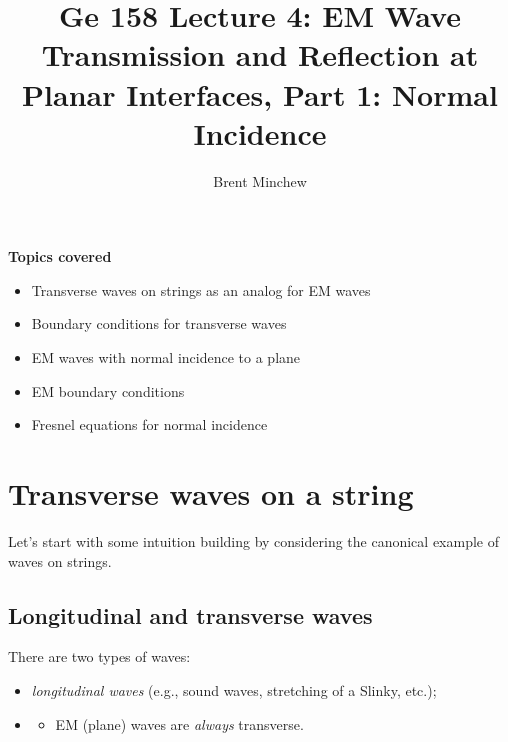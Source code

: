 \documentclass[11pt, oneside]{article}
\title{Ge 158 Lecture 4: EM Wave Transmission and Reflection at Planar Interfaces, Part 1: Normal Incidence}
\author{Brent Minchew}
\date{}
\begin{document}
\maketitle

\noindent\textbf{Topics covered}
\begin{itemize}
	\item Transverse waves on strings as an analog for EM waves
	\item Boundary conditions for transverse waves
	\item EM waves with normal incidence to a plane
	\item EM boundary conditions
	\item Fresnel equations for normal incidence
\end{itemize}

\section{Transverse waves on a string}

Let's start with some intuition building by considering the canonical example of waves on strings.

\subsection{Longitudinal and transverse waves}

There are two types of waves:
\begin{itemize}
	\item \emph{longitudinal waves} (e.g., sound waves, stretching of a Slinky, etc.);
	\item {}
	\begin{itemize}
		\item[$\hookrightarrow$] EM (plane) waves are \emph{always} transverse.
	\end{itemize}
\end{itemize}
\end{document}
